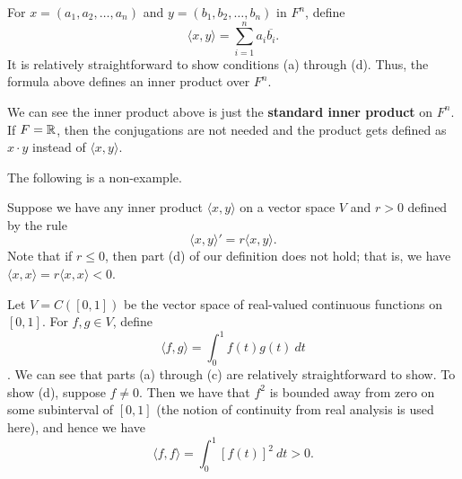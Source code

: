 \begin{eg}\label{Standard Inner Product}
    For \( x = ({a}_{1}, {a}_{2}, \dots, {a}_{n}) \) and \( y = ({b}_{1}, {b}_{2}, \dots, {b}_{n}) \) in \( F^{n} \), define 
    \[  \langle x,y \rangle = \sum_{ i=1 }^{ n } {a}_{i} \overline{{b}_{i}}. \]
It is relatively straightforward to show conditions (a) through (d). Thus, the formula above defines an inner product over \( F^{n} \).
\end{eg}

\begin{remark}
 We can see the inner product above is just the \textbf{standard inner product} on \( F^{n} \). If \( F = \mathbb{R}  \), then the conjugations are not needed and the product gets defined as \( x \cdot y  \) instead of \( \langle  x,y  \rangle \).
\end{remark}

The following is a non-example.

\begin{eg}
    Suppose we have any inner product \( \langle  x,y  \rangle \) on a vector space \( V  \) and \( r > 0  \) defined by the rule
    \[  \langle x,y \rangle' = r \langle x,y \rangle.  \]
    Note that if \( r \leq  0  \), then part (d) of our definition does not hold; that is, we have \( \langle x,x \rangle = r \langle x,x \rangle < 0  \).
\end{eg}

\begin{eg}
    Let \( V = C([0,1]) \) be the vector space of real-valued continuous functions on \( [0,1] \). For \( f,g \in V  \), define 
    \[ \langle f,g \rangle = \int_{ 0 }^{ 1 } f(t) g(t) \ dt \]. 
    We can see that parts (a) through (c) are relatively straightforward to show. To show (d), suppose \( f \neq 0  \). Then we have that \( f^{2} \) is bounded away from zero on some subinterval of \( [0,1] \) (the notion of continuity from real analysis is used here), and hence we have
    \[  \langle f,f \rangle = \int_{ 0 }^{ 1 }  [f(t)]^{2} \ dt > 0. \]
\end{eg}

